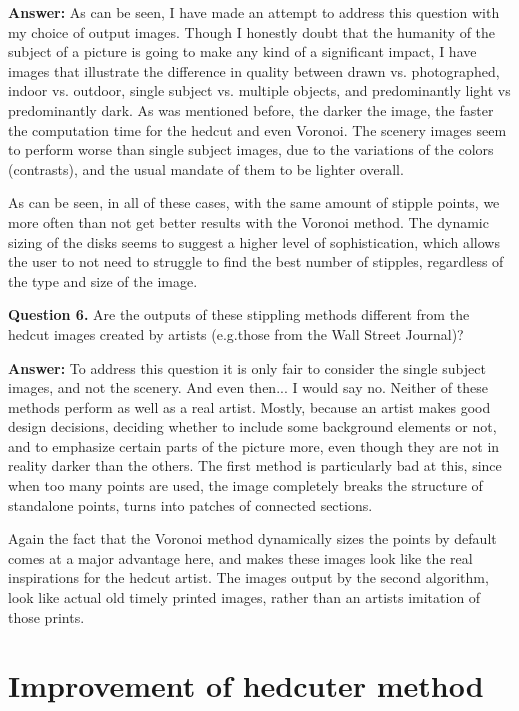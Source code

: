 \documentclass[11pt]{article}
\begin{document}
\textbf{Answer:} As can be seen, I have made an attempt to address this question with my choice of output images. Though I honestly doubt that the humanity of the subject of a picture is going to make any kind of a significant impact, I have images that illustrate the difference in quality between drawn vs. photographed, indoor vs. outdoor, single subject vs. multiple objects, and predominantly light vs predominantly dark. As was mentioned before, the darker the image, the faster the computation time for the hedcut and even Voronoi. The scenery images seem to perform worse than single subject images, due to the variations of the colors (contrasts), and the usual mandate of them to be lighter overall. 

As can be seen, in all of these cases, with the same amount of stipple points, we more often than not get better results with the Voronoi method. The dynamic sizing of the disks seems to suggest a higher level of sophistication, which allows the user to not need to struggle to find the best number of stipples, regardless of the type and size of the image. 

\textbf{Question 6.} Are the outputs of these stippling methods different from the hedcut images created by artists (e.g.those from the Wall Street Journal)?

\textbf{Answer:} To address this question it is only fair to consider the single subject images, and not the scenery. And even then... I would say no. Neither of these methods perform as well as a real artist. Mostly, because an artist makes good design decisions, deciding whether to include some background elements or not, and to emphasize certain parts of the picture more, even though they are not in reality darker than the others. The first method is particularly bad at this, since when too many points are used, the image completely breaks the structure of standalone points, turns into patches of connected sections. 

Again the fact that the Voronoi method dynamically sizes the points by default comes at a major advantage here, and makes these images look like the real inspirations for the hedcut artist. The images output by the second algorithm, look like actual old timely printed images, rather than an artists imitation of those prints. 

\section{Improvement of hedcuter method}
\end{document}
